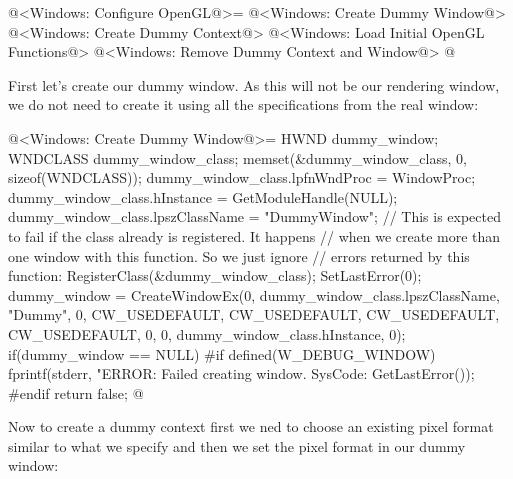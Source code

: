 \iniciocodigo
@<Windows: Configure OpenGL@>=
{
@<Windows: Create Dummy Window@>
@<Windows: Create Dummy Context@>
@<Windows: Load Initial OpenGL Functions@>
@<Windows: Remove Dummy Context and Window@>
}
@
\fimcodigo

First let's create our dummy window. As this will not be our rendering
window, we do not need to create it using all the specifications from
the real window:

\iniciocodigo
@<Windows: Create Dummy Window@>=
HWND dummy_window;
{
  WNDCLASS dummy_window_class;
  memset(&dummy_window_class, 0, sizeof(WNDCLASS));
  dummy_window_class.lpfnWndProc = WindowProc;
  dummy_window_class.hInstance = GetModuleHandle(NULL);
  dummy_window_class.lpszClassName = "DummyWindow";
  // This is expected to fail if the class already is registered. It happens
  // when we create more than one window with this function. So we just ignore
  // errors returned by this function:
  RegisterClass(&dummy_window_class);
  SetLastError(0);
  dummy_window = CreateWindowEx(0, dummy_window_class.lpszClassName, "Dummy",
                                0, CW_USEDEFAULT, CW_USEDEFAULT, CW_USEDEFAULT,
                                CW_USEDEFAULT, 0, 0,
                                dummy_window_class.hInstance, 0);
  if(dummy_window == NULL){
#if defined(W_DEBUG_WINDOW)
    fprintf(stderr, "ERROR: Failed creating window. SysCode: %
            GetLastError());
#endif
    return false;
  }
}
@
\fimcodigo

Now to create a dummy context first we ned to choose an existing pixel
format similar to what we specify and then we set the pixel format in
our dummy window:


